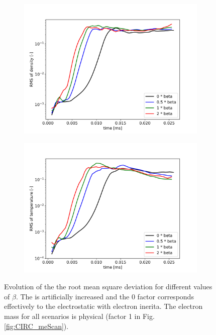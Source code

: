 \begin{figure}[H]\centering
	\begin{subfigure}[t]{0.45\textwidth}
		\centering
		\includegraphics[width=1\textwidth]{schemes/RMSn_betaScan.jpg}
	\end{subfigure}
	\begin{subfigure}[t]{0.45\textwidth}
		\centering
		\includegraphics[width=1\textwidth]{schemes/RMST_betaScan.jpg}
	\end{subfigure}
	\caption{Evolution of the the root mean square deviation for different values of $\beta$. The  is artificially increased and the 0 factor corresponds effectively to the electrostatic with electron inerita. The electron mass for all scenarios is physical (factor 1 in Fig. \ref{fig:CIRC_meScan}).}
	\label{fig:CIRC_betaScan}
\end{figure}

